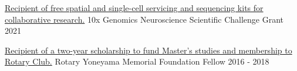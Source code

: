 %
%
%


\vspace*{0.5cm}

\begin{cventries}
    \cventry
        {\textnormal{\href{https://www.10xgenomics.com/blog/advancing-neuroscience-with-multidimensional-investigations}{Recipient of free spatial and single-cell servicing and sequencing kits for collaborative research.}}}
        {10x Genomics Neuroscience Scientific Challenge Grant}
        {2021}
        {}
        {}

    \vspace*{-0.1cm}

    \cventry
        {\textnormal{\href{https://hiroorc.org/event/20180215-2/}{Recipient of a two-year scholarship to fund Master's studies and membership to Rotary Club.}}}
        {Rotary Yoneyama Memorial Foundation Fellow}
        {2016 - 2018}
        {}
        {}

\end{cventries}

\vspace*{-0.65cm}

